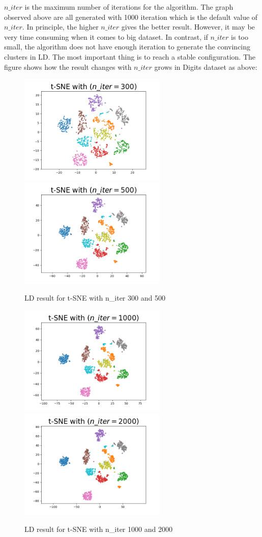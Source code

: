 \noindent $n\_iter$ is the maximum number of iterations for the algorithm. The graph observed above are all generated with 1000 iteration which is the default value of $n\_iter$. In principle, the higher $n\_iter$ gives the better result. However, it may be very time consuming when it comes to big dataset. In contrast, if $n\_iter$ is too small, the algorithm does not have enough iteration to generate the convincing clusters in LD. The most important thing is to reach a stable configuration. The figure shows how the result changes with $n\_iter$ grows in Digits dataset as above:

\begin{figure}[H]
\centering  %
{
\label{Fig.sub.1}
\includegraphics[width=7cm,height=3.5cm\textwidth]{images/t-sne/tsne_niter_300.png}}
{
\label{Fig.sub.2}
\includegraphics[width=7cm,height=3.5cm\textwidth]{images/t-sne/tsne_niter_500.png}}
\caption{LD result for t-SNE with n\_iter 300 and 500}
\end{figure}

\begin{figure}[H]
\centering  %
{
\label{Fig.sub.1}
\includegraphics[width=7cm,height=3.5cm\textwidth]{images/t-sne/tsne_niter_1000.png}}
{
\label{Fig.sub.2}
\includegraphics[width=7cm,height=3.5cm\textwidth]{images/t-sne/tsne_niter_2000.png}}
\caption{LD result for t-SNE with n\_iter 1000 and 2000}
\end{figure}


